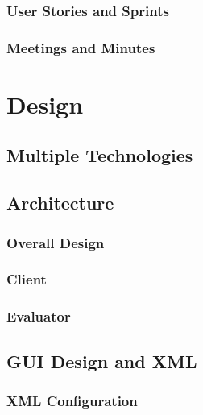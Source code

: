 \documentclass{l4proj}
\begin{document}
\subsection{User Stories and Sprints}


\subsection{Meetings and Minutes}


\chapter{Design}

\section{Multiple Technologies}



\section{Architecture}

\subsection{Overall Design}


\subsection{Client}


\subsection{Evaluator}


\section{GUI Design and XML}


\subsection{XML Configuration}

\end{document}
